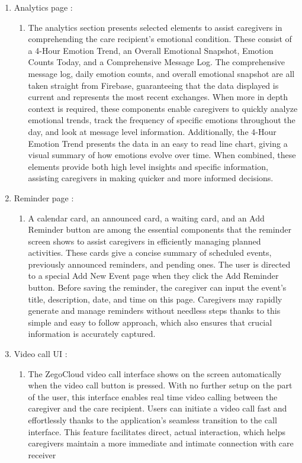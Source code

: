 \begin{enumerate}[leftmargin=2.2cm]
	\item Analytics page :
	\begin{enumerate}[label=\alph*.] 
		\item The analytics section presents selected elements to assist caregivers in comprehending the care recipient's emotional condition. These consist of a 4-Hour Emotion Trend, an Overall Emotional Snapshot, Emotion Counts Today, and a Comprehensive Message Log. The comprehensive message log, daily emotion counts, and overall emotional snapshot are all taken straight from Firebase, guaranteeing that the data displayed is current and represents the most recent exchanges. When more in depth context is required, these components enable caregivers to quickly analyze emotional trends, track the frequency of specific emotions throughout the day, and look at message level information. Additionally, the 4-Hour Emotion Trend presents the data in an easy to read line chart, giving a visual summary of how emotions evolve over time. When combined, these elements provide both high level insights and specific information, assisting caregivers in making quicker and more informed decisions.
	\end{enumerate}
	
	\item Reminder page :
	\begin{enumerate}[label=\alph*.] 
		\item A calendar card, an announced card, a waiting card, and an Add Reminder button are among the essential components that the reminder screen shows to assist caregivers in efficiently managing planned activities. These cards give a concise summary of scheduled events, previously announced reminders, and pending ones. The user is directed to a special Add New Event page when they click the Add Reminder button. Before saving the reminder, the caregiver can input the event's title, description, date, and time on this page. Caregivers may rapidly generate and manage reminders without needless steps thanks to this simple and easy to follow approach, which also ensures that crucial information is accurately captured. 
	\end{enumerate}
	
	\item Video call UI :
	\begin{enumerate}[label=\alph*.] 
		\item The ZegoCloud video call interface shows on the screen automatically when the video call button is pressed. With no further setup on the part of the user, this interface enables real time video calling between the caregiver and the care recipient. Users can initiate a video call fast and effortlessly thanks to the application's seamless transition to the call interface. This feature facilitates direct, actual interaction, which helps caregivers maintain a more immediate and intimate connection with care receiver
	\end{enumerate}
	
\end{enumerate}

